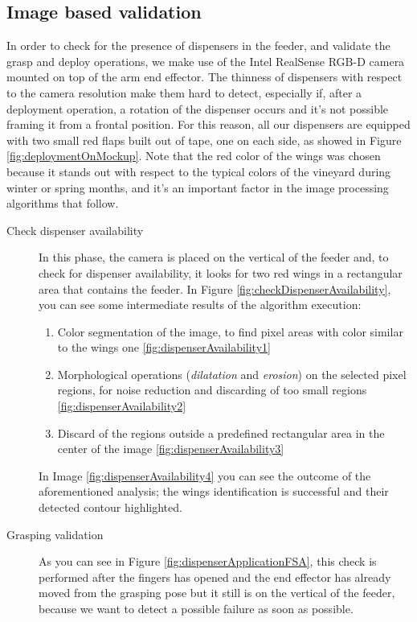 \subsection{Image based validation}\label{subsec:imageBasedValidationSec}
In order to check for the presence of dispensers in the feeder, and validate the grasp and deploy operations, we make use of the Intel RealSense RGB-D camera mounted on top of the arm end effector. The thinness of dispensers with respect to the camera resolution make them hard to detect, especially if, after a deployment operation, a rotation of the dispenser occurs and it's not possible framing it from a frontal position. For this reason, all our dispensers are equipped with two small red flaps built out of tape, one on each side, as showed in Figure \ref{fig:deploymentOnMockup}. Note that the red color of the wings was chosen because it stands out with respect to the typical colors of the vineyard during winter or spring months, and it's an important factor in the image processing algorithms that follow. 

\begin{description}
	\item [Check dispenser availability] In this phase, the camera is placed on the vertical of the feeder and, to check for dispenser availability, it looks for two red wings in a rectangular area that contains the feeder. In Figure \ref{fig:checkDispenserAvailability}, you can see some intermediate results of the algorithm execution:
		\begin{enumerate}
			\item Color segmentation of the image, to find pixel areas with color similar to the wings one \ref{fig:dispenserAvailability1}
			\item Morphological operations (\textit{dilatation} and \textit{erosion}) on the selected pixel regions, for noise reduction and discarding of too small regions \ref{fig:dispenserAvailability2}
			\item Discard of the regions outside a predefined rectangular area in the center of the image \ref{fig:dispenserAvailability3}
		\end{enumerate}
	In Image \ref{fig:dispenserAvailability4} you can see the outcome of the aforementioned analysis; the wings identification is successful and their detected contour highlighted.
	
	\item[Grasping validation] As you can see in Figure \ref{fig:dispenserApplicationFSA}, this check is performed after the fingers has opened and the end effector has already moved from the grasping pose but it still is on the vertical of the feeder, because we want to detect a possible failure as soon as possible. 
\end{description}





